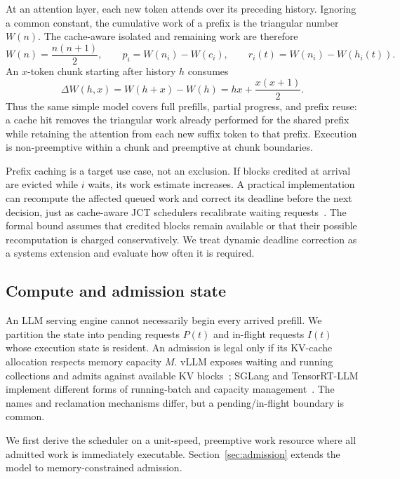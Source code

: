 \documentclass{article}
\begin{document}
At an attention layer, each new token attends over its preceding history.
Ignoring a common constant, the cumulative work of a prefix is the triangular
number $W(n)$.  The cache-aware isolated and remaining work are therefore
\begin{equation}
    W(n)=\frac{n(n+1)}{2},\qquad p_i=W(n_i)-W(c_i),\qquad r_i(t)=W(n_i)-W(h_i(t)).
    \label{eq:work-model}
\end{equation}
An $x$-token chunk starting after history $h$ consumes
\begin{equation}
    \Delta W(h,x)=W(h+x)-W(h)=hx+\frac{x(x+1)}{2}.
    \label{eq:chunk-work}
\end{equation}
Thus the same simple model covers full prefills, partial progress, and prefix
reuse: a cache hit removes the triangular work already performed for the shared
prefix while retaining the attention from each new suffix token to that prefix.
Execution is non-preemptive within a chunk and preemptive at chunk boundaries.

Prefix caching is a target use case, not an exclusion.  If blocks credited at
arrival are evicted while $i$ waits, its work estimate increases.  A practical
implementation can recompute the affected queued work and correct its deadline
before the next decision, just as cache-aware JCT schedulers recalibrate waiting
requests~\citep{du2025prefillonly}.  The formal bound assumes that credited
blocks remain available or that their possible recomputation is charged
conservatively.  We treat dynamic deadline correction as a systems extension
and evaluate how often it is required.

\subsection{Compute and admission state}

An LLM serving engine cannot necessarily begin every arrived prefill.  We
partition the state into pending requests $P(t)$ and in-flight requests $I(t)$
whose execution state is resident.  An admission is legal only if its KV-cache
allocation respects memory capacity $M$.  vLLM exposes waiting and running
collections and admits against available KV blocks~\citep{kwon2023vllm,
vllmSchedulerDocs}; SGLang and TensorRT-LLM implement different forms of
running-batch and capacity management~\citep{zheng2024sglang,
tensorrtExecutorDocs}.  The names and reclamation mechanisms differ, but a
pending/in-flight boundary is common.

We first derive the scheduler on a unit-speed, preemptive work resource where
all admitted work is immediately executable.  Section~\ref{sec:admission}
extends the model to memory-constrained admission.
\end{document}
